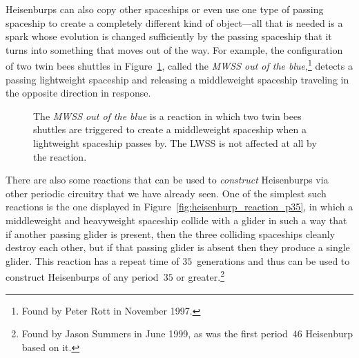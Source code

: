 Heisenburps can also copy other spaceships or even use one type of passing spaceship to create a completely different kind of object---all that is needed is a spark whose evolution is changed sufficiently by the passing spaceship that it turns into something that moves out of the way. For example, the configuration of two twin bees shuttles in Figure~\ref{fig:mwss_out_of_the_blue}, called the \emph{MWSS out of the blue},\footnote{Found by Peter Rott in November 1997.} detects a passing lightweight spaceship and releasing a middleweight spaceship traveling in the opposite direction in response.

\begin{figure}[!htb]
	\centering
	\caption{The \emph{MWSS out of the blue} is a reaction in which two twin bees shuttles are triggered to create a middleweight spaceship when a lightweight spaceship passes by. The LWSS is not affected at all by the reaction.}\label{fig:mwss_out_of_the_blue}
\end{figure}

There are also some reactions that can be used to \emph{construct} Heisenburps via other periodic circuitry that we have already seen. One of the simplest such reactions is the one displayed in Figure~\ref{fig:heisenburp_reaction_p35}, in which a middleweight and heavyweight spaceship collide with a glider in such a way that if another passing glider is present, then the three colliding spaceships cleanly destroy each other, but if that passing glider is absent then they produce a single glider. This reaction has a repeat time of $35$~generations and thus can be used to construct Heisenburps of any period~$35$ or greater.\footnote{Found by Jason Summers in June 1999, as was the first period~$46$ Heisenburp based on it.}

